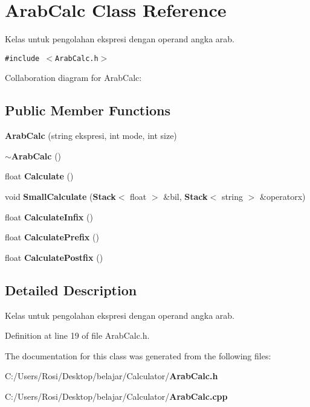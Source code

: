 \section{Arab\-Calc Class Reference}
\label{class_arab_calc}
Kelas untuk pengolahan ekspresi dengan operand angka arab.  


{\tt \#include $<$Arab\-Calc.h$>$}

Collaboration diagram for Arab\-Calc:\subsection*{Public Member Functions}
\begin{CompactItemize}
\item 
{\bf Arab\-Calc} (string ekspresi, int mode, int size)\label{class_arab_calc_b8753fcf7122ff1c02af495cd391ec04}

\item 
{\bf $\sim$Arab\-Calc} ()\label{class_arab_calc_3f083162c86a86c8f5039f4c1e033e4e}

\item 
float {\bf Calculate} ()\label{class_arab_calc_ef3b608a0cfab3929e1afe02afe9e580}

\item 
void {\bf Small\-Calculate} ({\bf Stack}$<$ float $>$ \&bil, {\bf Stack}$<$ string $>$ \&operatorx)\label{class_arab_calc_39d423c5d2e7a2c63c57b26c42a65915}

\item 
float {\bf Calculate\-Infix} ()\label{class_arab_calc_39a440cd99043f8ef3809d8191620779}

\item 
float {\bf Calculate\-Prefix} ()\label{class_arab_calc_968d7f0f8876ad0fb9a25576e0f0e7c6}

\item 
float {\bf Calculate\-Postfix} ()\label{class_arab_calc_81d5c7f43d3de276cafd11096ec6204c}

\end{CompactItemize}


\subsection{Detailed Description}
Kelas untuk pengolahan ekspresi dengan operand angka arab. 



Definition at line 19 of file Arab\-Calc.h.

The documentation for this class was generated from the following files:\begin{CompactItemize}
\item 
C:/Users/Rosi/Desktop/belajar/Calculator/{\bf Arab\-Calc.h}\item 
C:/Users/Rosi/Desktop/belajar/Calculator/{\bf Arab\-Calc.cpp}\end{CompactItemize}
